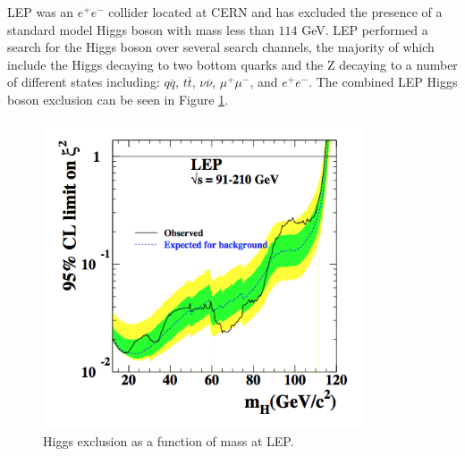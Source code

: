 LEP was an $e^{+}e^{-}$ collider located at CERN and has excluded the presence of a standard model Higgs boson with mass less than $114$ GeV.
LEP performed a search for the Higgs boson over several search channels, the majority of which include the Higgs decaying to two bottom quarks and the Z decaying to a number of different states including: $q\overline{q}$, $t\overline{t}$, $\nu\overline{\nu}$, $\mu^{+}\mu^{-}$, and $e^{+}e^{-}$\cite{PDGREVIEW}.
The combined LEP Higgs boson exclusion can be seen in Figure \ref{fig:lepexclusion}.
\begin{figure}[htpb]
\begin{center}
\centerline{\includegraphics[width=0.85\textwidth]{plots/lephiggs.png}}%
\caption{
  Higgs exclusion as a function of mass at LEP\cite{PDGREVIEW}.
}
\label{fig:lepexclusion}
\end{center}
\end{figure}

